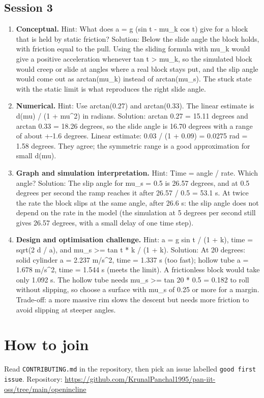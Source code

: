 \documentclass[11pt,a4paper]{article}
\begin{document}
\subsection*{Session 3}
\begin{enumerate}[nosep]
\item \textbf{Conceptual.} Hint: What does a = g (sin t - mu\_k cos t) give for a block that is held by static friction? Solution: Below the slide angle the block holds, with friction equal to the pull. Using the sliding formula with mu\_k would give a positive acceleration whenever tan t \textgreater{} mu\_k, so the simulated block would creep or slide at angles where a real block stays put, and the slip angle would come out as arctan(mu\_k) instead of arctan(mu\_s). The stuck state with the static limit is what reproduces the right slide angle.
\item \textbf{Numerical.} Hint: Use arctan(0.27) and arctan(0.33). The linear estimate is d(mu) / (1 + mu\textasciicircum{}2) in radians. Solution: arctan 0.27 = 15.11 degrees and arctan 0.33 = 18.26 degrees, so the slide angle is 16.70 degrees with a range of about +-1.6 degrees. Linear estimate: 0.03 / (1 + 0.09) = 0.0275 rad = 1.58 degrees. They agree; the symmetric range is a good approximation for small d(mu).
\item \textbf{Graph and simulation interpretation.} Hint: Time = angle / rate. Which angle? Solution: The slip angle for mu\_s = 0.5 is 26.57 degrees, and at 0.5 degrees per second the ramp reaches it after 26.57 / 0.5 = 53.1 s. At twice the rate the block slips at the same angle, after 26.6 s: the slip angle does not depend on the rate in the model (the simulation at 5 degrees per second still gives 26.57 degrees, with a small delay of one time step).
\item \textbf{Design and optimisation challenge.} Hint: a = g sin t / (1 + k), time = sqrt(2 d / a), and mu\_s \textgreater{}= tan t * k / (1 + k). Solution: At 20 degrees: solid cylinder a = 2.237 m/s\textasciicircum{}2, time = 1.337 s (too fast); hollow tube a = 1.678 m/s\textasciicircum{}2, time = 1.544 s (meets the limit). A frictionless block would take only 1.092 s. The hollow tube needs mu\_s \textgreater{}= tan 20 * 0.5 = 0.182 to roll without slipping, so choose a surface with mu\_s of 0.25 or more for a margin. Trade-off: a more massive rim slows the descent but needs more friction to avoid slipping at steeper angles.
\end{enumerate}

\section{How to join}
Read \texttt{CONTRIBUTING.md} in the repository, then pick an issue labelled \texttt{good first issue}. Repository: \url{https://github.com/KrunalPanchal1995/pan-iit-oss/tree/main/openincline}
\end{document}
